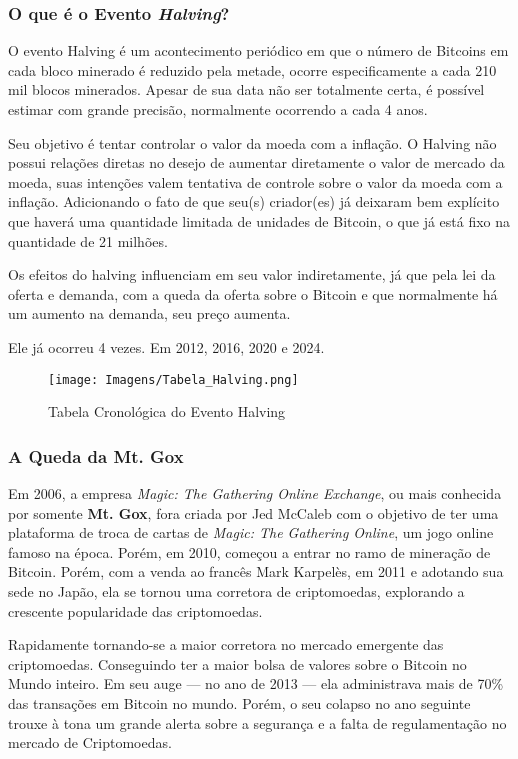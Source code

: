 \subsubsection{\textbf{O que é o Evento \textit{Halving}?}}
O evento Halving é um acontecimento periódico em que o número de Bitcoins em cada bloco minerado é reduzido pela metade, ocorre especificamente a cada 210 mil blocos minerados. Apesar de sua data não ser totalmente certa, é possível estimar com grande precisão, normalmente ocorrendo a cada 4 anos.

Seu objetivo é tentar controlar o valor da moeda com a inflação. O Halving não possui relações diretas no desejo de aumentar diretamente o valor de mercado da moeda, suas intenções valem tentativa de controle sobre o valor da moeda com a inflação. Adicionando o fato de que seu(s) criador(es) já deixaram bem explícito que haverá uma quantidade limitada de unidades de Bitcoin, o que já está fixo na quantidade de 21 milhões.

Os efeitos do halving influenciam em seu valor indiretamente, já que pela lei da oferta e demanda, com a queda da oferta sobre o Bitcoin e que normalmente há um aumento na demanda, seu preço aumenta.

Ele já ocorreu 4 vezes. Em 2012, 2016, 2020 e 2024.

\begin{figure}[h]
    \centering
    \texttt{[image: Imagens/Tabela\_Halving.png]}
    \caption{Tabela Cronológica do Evento Halving}
    \label{fig:Tabela Cronologica do Evento Halving}
\end{figure}

\subsubsection{\textbf{A Queda da Mt. Gox}}
Em 2006, a empresa \textit{Magic: The Gathering Online Exchange}, ou mais conhecida por somente \textbf{Mt. Gox}, fora criada por Jed McCaleb com o objetivo de ter uma plataforma de troca de cartas de \textit{Magic: The Gathering Online}, um jogo online famoso na época.  Porém, em 2010, começou a entrar no ramo de mineração de Bitcoin. Porém, com a venda ao francês Mark Karpelès, em 2011 e adotando sua sede no Japão, ela se tornou uma corretora de criptomoedas, explorando a crescente popularidade das criptomoedas.

Rapidamente tornando-se a maior corretora no mercado emergente das criptomoedas. Conseguindo ter a maior bolsa de valores sobre o Bitcoin no Mundo inteiro. Em seu auge — no ano de 2013 — ela administrava mais de 70\% das transações em Bitcoin no mundo. Porém, o seu colapso no ano seguinte trouxe à tona um grande alerta sobre a segurança e a falta de regulamentação no mercado de Criptomoedas.

